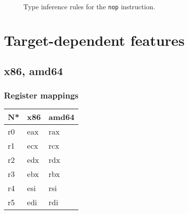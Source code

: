 \begin{figure}[H]
  \centering

  \begin{prooftree}
  \end{prooftree}

  \caption{Type inference rules for the \texttt{nop} instruction.}
  \label{fig:nstar-instructionset-nop-typerules}
\end{figure}

\chapter{Target-dependent features}\label{chap:nstar-specific}

\section{x86, amd64}\label{sec:nstar-specific-x86amd64}

\subsection{Register mappings}\label{subsec:nstar-specific-x86amd64-registers}

\begin{tabularx}{\textwidth}{Y Y Y}
  \toprule
  N* & x86 & amd64 \\
  \midrule
  r0 & eax & rax \\
  r1 & ecx & rcx \\
  r2 & edx & rdx \\
  r3 & ebx & rbx \\
  r4 & esi & rsi \\
  r5 & edi & rdi \\
  \bottomrule
\end{tabularx}
